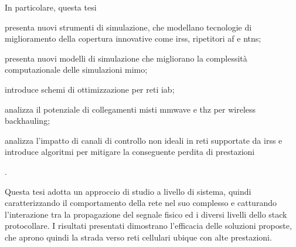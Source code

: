 In particolare, questa tesi
\begin{enumerate*}[label=(\roman*)]
\item presenta nuovi strumenti di simulazione, che modellano tecnologie di miglioramento della copertura innovative come \glspl{irs}, ripetitori \gls{af} e \glspl{ntn};
\item presenta nuovi modelli di simulazione che migliorano la complessità computazionale delle simulazioni \gls{mimo};
\item introduce schemi di ottimizzazione per reti \gls{iab};
\item analizza il potenziale di collegamenti misti \gls{mmwave} e \gls{thz} per wireless backhauling;
\item analizza l'impatto di canali di controllo non ideali in reti supportate da \glspl{irs} e introduce algoritmi per mitigare la conseguente perdita di prestazioni
\end{enumerate*}.

Questa tesi adotta un approccio di studio a livello di sistema, quindi caratterizzando il comportamento della rete nel suo complesso e catturando l'in\-te\-ra\-zio\-ne tra la propagazione del segnale fisico ed i diversi livelli dello stack protocollare. I risultati presentati dimostrano l'efficacia delle soluzioni proposte, che aprono quindi la strada verso reti cellulari ubique con alte prestazioni.
